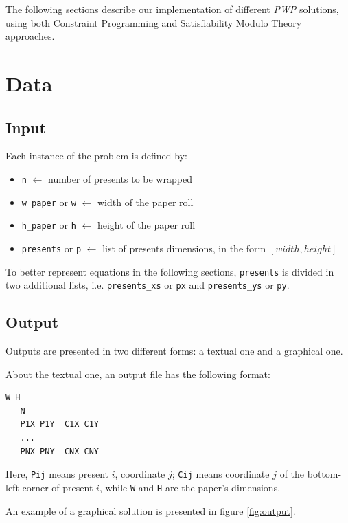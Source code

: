 \documentclass[a4paper,10pt]{article}
\begin{document}
The following sections describe our implementation of different \textit{PWP} solutions, using both Constraint Programming and Satisfiability Modulo Theory approaches.

\section{Data}
\subsection{Input}
Each instance of the problem is defined by:
\begin{itemize}
   \item \texttt{n} $\longleftarrow$ number of presents to be wrapped
   \item \texttt{w\_paper} or \texttt{w} $\longleftarrow$ width of the paper roll
   \item \texttt{h\_paper} or \texttt{h} $\longleftarrow$ height of the paper roll
   \item \texttt{presents} or \texttt{p} $\longleftarrow$ list of presents dimensions, in the form $[width,height]$
\end{itemize}

To better represent equations in the following sections, \texttt{presents} is divided in two additional lists, i.e. \texttt{presents\_xs} or \texttt{px} and \texttt{presents\_ys} or \texttt{py}.

\subsection{Output}
Outputs are presented in two different forms: a textual one and a graphical one. 

About the textual one, an output file has the following format:

\begin{Verbatim}[samepage=true]
   W H
   N
   P1X P1Y  C1X C1Y
   ...
   PNX PNY  CNX CNY
\end{Verbatim}

Here, \texttt{Pij} means present $i$, coordinate $j$; \texttt{Cij} means coordinate $j$ of the bottom-left corner of present $i$, while \texttt{W} and \texttt{H} are the paper's dimensions.

An example of a graphical solution is presented in figure \ref{fig:output}.
\end{document}
